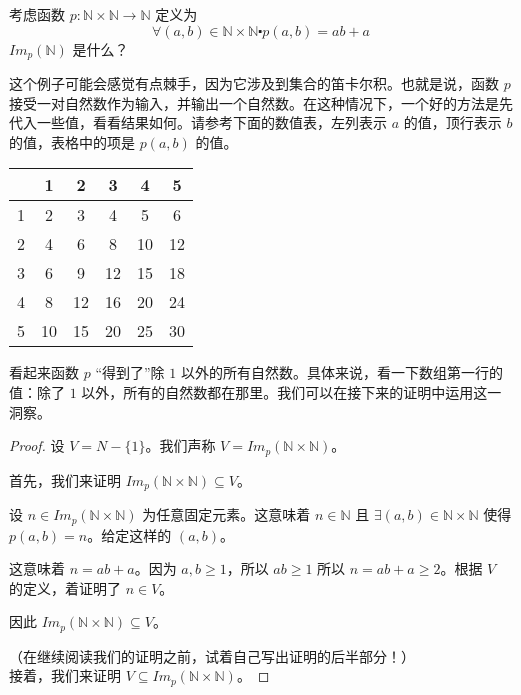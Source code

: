\begin{example}
    考虑函数 $p:\mathbb{N} \times \mathbb{N} \to \mathbb{N}$ 定义为
    \[\forall (a, b) \in \mathbb{N} \times \mathbb{N} \centerdot p(a, b) = ab + a\]
    $Im_p(\mathbb{N})$ 是什么？

    这个例子可能会感觉有点棘手，因为它涉及到集合的笛卡尔积。也就是说，函数 $p$ 接受一对自然数作为输入，并输出一个自然数。在这种情况下，一个好的方法是先代入一些值，看看结果如何。请参考下面的数值表，左列表示 $a$ 的值，顶行表示 $b$ 的值，表格中的项是 $p(a, b)$ 的值。

    \begin{center}
        \begin{tabular}{c|ccccc}
              &  1 &  2 &  3 &  4 & 5  \\
            \hline
            1 &  2 &  3 &  4 &  5 & 6  \\
            2 &  4 &  6 &  8 & 10 & 12 \\
            3 &  6 &  9 & 12 & 15 & 18 \\
            4 &  8 & 12 & 16 & 20 & 24 \\
            5 & 10 & 15 & 20 & 25 & 30 \\
        \end{tabular}
    \end{center}

    看起来函数 $p$ ``得到了''除 $1$ 以外的所有自然数。具体来说，看一下数组第一行的值：除了 $1$ 以外，所有的自然数都在那里。我们可以在接下来的证明中运用这一洞察。

    \begin{proof}
        设 $V = N - \{1\}$。我们声称 $V = Im_p(\mathbb{N} \times \mathbb{N})$。

        首先，我们来证明 $Im_p(\mathbb{N} \times \mathbb{N}) \subseteq V$。

        设 $n \in Im_p(\mathbb{N} \times \mathbb{N})$ 为任意固定元素。这意味着 $n \in \mathbb{N}$ 且 $\exists (a,b) \in \mathbb{N} \times \mathbb{N}$ 使得 $p(a,b)=n$。给定这样的 $(a,b)$。

        这意味着 $n=ab+a$。因为 $a,b \ge 1$，所以 $ab \ge 1$ 所以 $n = ab + a \ge 2$。根据 $V$ 的定义，着证明了 $n \in V$。

        因此 $Im_p(\mathbb{N} \times \mathbb{N}) \subseteq V$。

        （在继续阅读我们的证明之前，试着自己写出证明的后半部分！）\\

        接着，我们来证明 $V \subseteq Im_p(\mathbb{N} \times \mathbb{N})$。


\end{proof}
\end{example}
